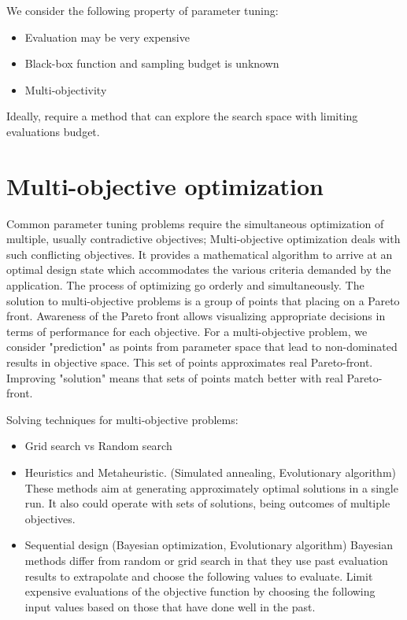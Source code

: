         We consider the following property of parameter tuning:
        \begin{itemize}
            \item Evaluation may be very expensive
            \item Black-box function and sampling budget is unknown
            \item Multi-objectivity
        \end{itemize}

        Ideally, require a method that can explore the search space with limiting evaluations budget. 
    

    \section{Multi-objective optimization}
        Common parameter tuning problems require the simultaneous optimization of multiple, usually contradictive objectives; Multi-objective optimization deals with such conflicting objectives. It provides a mathematical algorithm to arrive at an optimal design state which accommodates the various criteria demanded by the application. The process of optimizing go orderly and simultaneously. The solution to multi-objective problems is a group of points that placing on a Pareto front. Awareness of the Pareto front allows visualizing appropriate decisions in terms of performance for each objective. For a multi-objective problem, we consider "prediction" as points from parameter space that lead to non-dominated results in objective space. This set of points approximates real Pareto-front. Improving "solution" means that sets of points match better with real Pareto-front.



        Solving techniques for multi-objective problems: 
        \begin{itemize}
            \item Grid search vs Random search
            \item Heuristics and Metaheuristic. (Simulated annealing, Evolutionary algorithm) These methods aim at generating approximately optimal solutions in a single run. It also could operate with sets of solutions, being outcomes of multiple objectives.
            \item Sequential design (Bayesian optimization, Evolutionary algorithm) Bayesian methods differ from random or grid search in that they use past evaluation results to extrapolate and choose the following values to evaluate. Limit expensive evaluations of the objective function by choosing the following input values based on those that have done well in the past.
        \end{itemize}

